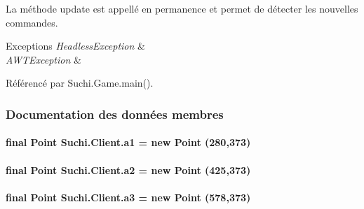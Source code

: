 La méthode update est appellé en permanence et permet de détecter les nouvelles commandes. 


\begin{DoxyExceptions}{Exceptions}
{\em Headless\+Exception} & \\
\hline
{\em A\+W\+T\+Exception} & \\
\hline
\end{DoxyExceptions}


Référencé par Suchi.\+Game.\+main().



\subsubsection{Documentation des données membres}
\hypertarget{classSuchi_1_1Client_a73039e1ad15b729f9432670b85e34b3b}{}
\paragraph[{a1}]{\setlength{\rightskip}{0pt plus 5cm}final Point Suchi.\+Client.\+a1 = new Point (280,373)\hspace{0.3cm}{\ttfamily [private]}}\label{classSuchi_1_1Client_a73039e1ad15b729f9432670b85e34b3b}
\hypertarget{classSuchi_1_1Client_a79d43b768d46513e88699479f8c990a3}{}
\paragraph[{a2}]{\setlength{\rightskip}{0pt plus 5cm}final Point Suchi.\+Client.\+a2 = new Point (425,373)\hspace{0.3cm}{\ttfamily [private]}}\label{classSuchi_1_1Client_a79d43b768d46513e88699479f8c990a3}
\hypertarget{classSuchi_1_1Client_a192135bbe1b59fd33d1bc0bdabc8037d}{}
\paragraph[{a3}]{\setlength{\rightskip}{0pt plus 5cm}final Point Suchi.\+Client.\+a3 = new Point (578,373)\hspace{0.3cm}{\ttfamily [private]}}\label{classSuchi_1_1Client_a192135bbe1b59fd33d1bc0bdabc8037d}
\hypertarget{classSuchi_1_1Client_afcbd53977c80f31d0b75d8ff5a99ff6c}{}
